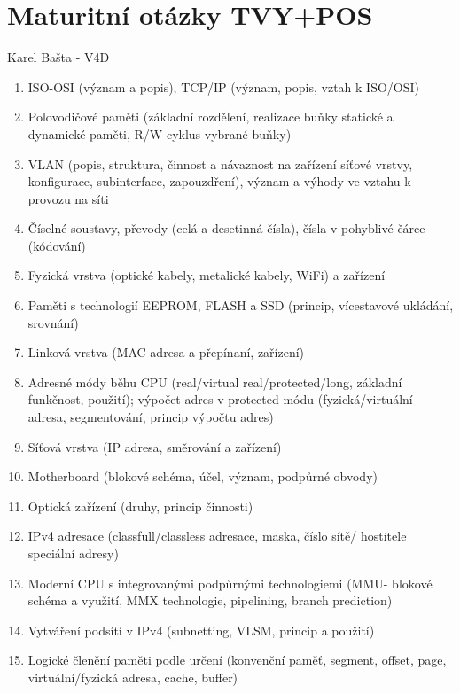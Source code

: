 \documentclass[11pt]{article}
\begin{document}
    
    \section*{Maturitní otázky TVY+POS}
        \begin{center}
            \Large Karel Bašta - V4D
        \end{center}
        \begin{enumerate}
            \item ISO-OSI (význam a popis), TCP/IP (význam, popis, vztah k ISO/OSI)
            \item Polovodičové paměti (základní rozdělení, realizace buňky statické a dynamické paměti, R/W cyklus vybrané buňky)
            \item VLAN (popis, struktura, činnost a návaznost na zařízení síťové vrstvy, konfigurace, subinterface, zapouzdření), význam a výhody ve vztahu k provozu na síti
            \item Číselné soustavy, převody (celá a desetinná čísla), čísla v pohyblivé čárce (kódování)
            \item Fyzická vrstva (optické kabely, metalické kabely, WiFi) a zařízení
            \item Paměti s technologií EEPROM, FLASH a SSD (princip, vícestavové ukládání, srovnání)
            \item Linková vrstva (MAC adresa a přepínaní, zařízení)
            \item Adresné módy běhu CPU (real/virtual real/protected/long, základní funkčnost, použití); výpočet adres v protected módu (fyzická/virtuální adresa, segmentování, princip výpočtu adres)
            \item Síťová vrstva (IP adresa, směrování a zařízení)
            \item Motherboard (blokové schéma, účel, význam, podpůrné obvody)
            \item Optická zařízení (druhy, princip činnosti) 
            \item IPv4 adresace (classfull/classless adresace, maska, číslo sítě/ hostitele speciální adresy)
            \item Moderní CPU s integrovanými podpůrnými technologiemi (MMU- blokové schéma a využití, MMX technologie, pipelining, branch prediction)
            \item Vytváření podsítí v IPv4 (subnetting, VLSM, princip a použití)
            \item Logické členění paměti podle určení (konvenční paměť, segment, offset, page, virtuální/fyzická adresa, cache, buffer)

\end{enumerate}
\end{document}
